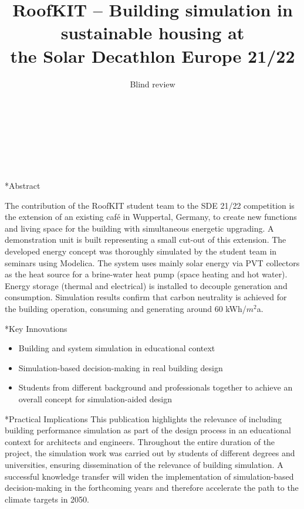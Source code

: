 \documentclass[twocolumn, a4paper,10pt]{article}
\title{%
RoofKIT – Building simulation in sustainable housing at \\%
\vspace{4pt}
the Solar Decathlon Europe 21/22} %
\author{%
Blind review
\phantom{Line 4}\\ %
\phantom{Line 5}\\ %
\phantom{Line 6}\\ %
\phantom{Line 7}\\ %
\phantom{Line 8}\\ %
\phantom{Line 9}\\} %
\date{\vspace{-0.5cm}}	%
\makeatletter
\renewcommand\section{\@startsection{section}{1}{\z@}{3pt}{3pt}{\normalfont\large\bfseries}}
\makeatother
\begin{document}
\maketitle
\section*{Abstract}	%
\addtocounter{section}{1}
The contribution of the RoofKIT student team to the SDE 21/22 competition is the extension of an existing café in Wuppertal, Germany, to create new functions and living space for the building with simultaneous energetic upgrading. A demonstration unit is built representing a small cut-out of this extension. The developed energy concept was thoroughly simulated by the student team in seminars using Modelica. The system uses mainly solar energy via PVT collectors as the heat source for a brine-water heat pump (space heating and hot water). Energy storage (thermal and electrical) is installed to decouple generation and consumption. Simulation results confirm that carbon neutrality is achieved for the building operation, consuming and generating around 60 kWh/$m^2$a.

\section*{Key Innovations}
\begin{itemize}
\item Building and system simulation in educational context
\item Simulation-based decision-making in real building design
\item Students from different background and professionals together to achieve an overall concept for simulation-aided design
\end{itemize}

\section*{Practical Implications}
This publication highlights the relevance of including building performance simulation as part of the design process in an educational context for architects and engineers. Throughout the entire duration of the project, the simulation work was carried out by students of different degrees and universities, ensuring dissemination of the relevance of building simulation. A successful knowledge transfer will widen the implementation of simulation-based decision-making in the forthcoming years and therefore accelerate the path to the climate targets in 2050.  
\end{document}
